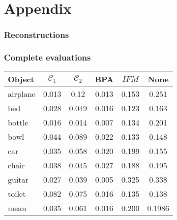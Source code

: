 \chapter{Appendix}
\label{sec:appendix}

\subsection*{Reconstructions}
\label{optrecon}

\subsection*{Complete evaluations}
\label{completeopt}

\begin{center}
     \label{tab:distance256opt} 
    \begin{tabular}{| l  | c  | c | c | c || c |}
        \hline
        Object& $\mathcal{C}_1$ & $\mathcal{C}_2$ & BPA & $IFM$  & None\\ \hline
        airplane&0.013&0.12&0.013&0.153&0.251\\\hline
        bed&0.028&0.049&0.016&0.123&0.163\\\hline 
        bottle&0.016&0.014&0.007&0.134&0.201\\\hline
        bowl&0.044&0.089&0.022&0.133&0.148\\\hline
        car&0.035&0.058&0.020&0.199&0.155\\\hline
        chair&0.038&0.045&0.027&0.188&0.195\\\hline
        guitar&0.027&0.039&0.005&0.325&0.338\\\hline
        toilet&0.082&0.075&0.016&0.135&0.138\\\hline\hline
        mean&0.035&0.061&0.016&0.200&0.1986\\        \hline
    \end{tabular}
\end{center}
